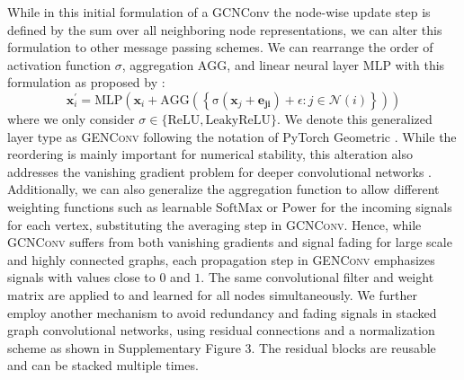 \documentclass{bioinfo}
\renewcommand{\cite}{\citep}
\begin{document}
While in this initial formulation of a GCNConv the node-wise update
step is defined by the sum over all neighboring node representations,
we can alter this formulation to other message passing schemes.  We
can rearrange the order of activation function $\sigma$, aggregation
$\mathrm{AGG}$, and linear neural layer $\mathrm{MLP}$ with this
formulation as proposed by \citet{GENConv2020}:
\begin{equation}
	\mathbf{x}_i^{\prime} = \mathrm{MLP} \left( \mathbf{x}_i +
	\mathrm{AGG} \left( \left\{
	\mathrm{\sigma} \left( \mathbf{x}_j + \mathbf{e_{ji}} \right) +\epsilon
	: j \in \mathcal{N}(i) \right\} \right)
	\right)
\end{equation}
where we only consider
$\sigma \in \{\mathrm{ReLU}, \mathrm{LeakyReLU}\}$. We denote this
generalized layer type as \textsc{GENConv} following the notation of
PyTorch Geometric \cite{PytorchGeometric}.  While the reordering is
mainly important for numerical stability, this alteration also addresses
the vanishing gradient problem for deeper convolutional networks
\cite{GENConv2020}. Additionally, we can also generalize the
aggregation function to allow different weighting functions such as
learnable $\mathrm{SoftMax}$ or $\mathrm{Power}$ for the incoming
signals for each vertex, substituting the averaging step in
\textsc{GCNConv}. Hence, while \textsc{GCNConv} suffers from both
vanishing gradients and signal fading for large scale and highly
connected graphs, each propagation step in \textsc{GENConv} emphasizes
signals with values close to $0$ and $1$. The same convolutional
filter and weight matrix are applied to and learned for all nodes
simultaneously. %
We further employ another mechanism to avoid redundancy and fading
signals in stacked graph convolutional networks, using residual
connections and a normalization scheme \cite{DeepGCN2019,
  GENConv2020} as shown in Supplementary Figure 3.  The residual
blocks are reusable and can be stacked multiple times.

\end{document}
